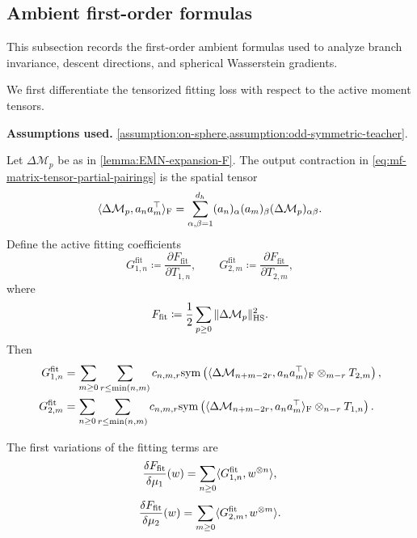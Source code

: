 
\subsection{Ambient first-order formulas}
\label{subsec:useful-first-order-formulas}

This subsection records the first-order ambient formulas used to analyze branch invariance, descent directions, and spherical Wasserstein gradients.

We first differentiate the tensorized fitting loss with respect to the active
moment tensors.
\begin{lemma}
\label{lemma:EMN-moment-gradients}
\textbf{Assumptions used.} \cref{assumption:on-sphere,assumption:odd-symmetric-teacher}.

Let $\Delta\mathcal M_p$ be as in \cref{lemma:EMN-expansion-F}.
The output contraction in
\eqref{eq:mf-matrix-tensor-partial-pairings} is the spatial tensor
\[
 \langle\Delta\mathcal M_p,a_na_m^\top\rangle_{\rm F}
 =\sum_{\alpha,\beta=1}^{d_h}
        (a_n)_\alpha(a_m)_\beta(\Delta\mathcal M_p)_{\alpha\beta}.
\]
Define the active fitting coefficients
\begin{equation}
    G_{1,n}^{\mathrm{fit}} \coloneq \frac{\partial F_{\mathrm{fit}}}{\partial T_{1,n}},
    \qquad
    G_{2,m}^{\mathrm{fit}} \coloneq \frac{\partial F_{\mathrm{fit}}}{\partial T_{2,m}},
\end{equation}
where
\begin{equation}
    F_{\mathrm{fit}}
    \coloneq
    \frac12\sum_{p\ge0}\|\Delta\mathcal M_p\|_{\mathrm{HS}}^2.
\end{equation}
Then
\begin{align}
    G_{1,n}^{\mathrm{fit}}
    &=
    \sum_{m\ge 0}\sum_{r\le \min(n,m)}
    c_{n,m,r}
    \mathrm{sym}\left({\langle \Delta\mathcal M_{n+m-2r}, a_n a_m^\top\rangle_{\mathrm{F}} \otimes_{m-r} T_{2,m}}\right),
    \\
    G_{2,m}^{\mathrm{fit}}
    &=
    \sum_{n\ge 0}\sum_{r\le \min(n,m)}
    c_{n,m,r}
    \mathrm{sym}\left({\langle \Delta\mathcal M_{n+m-2r}, a_n a_m^\top\rangle_{\mathrm{F}} \otimes_{n-r} T_{1,n}}\right).
\end{align}

The first variations of the fitting terms are
\begin{equation}
\label{eq:first-variation-squared-chi2-objective}
    \frac{\delta F_\mathrm{fit}}{\delta \mu_1}(w)
    =
    \sum_{n\ge0}\langle G_{1,n}^{\mathrm{fit}},w^{\otimes n}\rangle,
\end{equation}
\begin{equation}
    \frac{\delta F_\mathrm{fit}}{\delta \mu_2}(w)
    =
    \sum_{m\ge0}\langle G_{2,m}^{\mathrm{fit}},w^{\otimes m}\rangle.
\end{equation}
\end{lemma}

